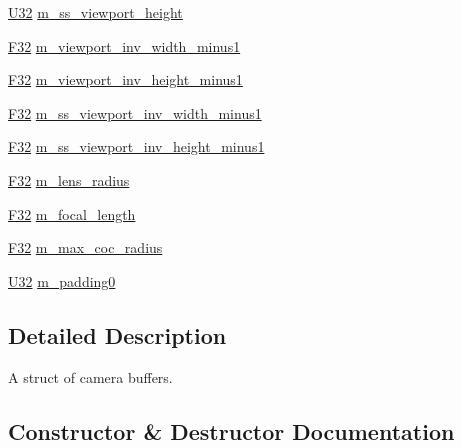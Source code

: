 \begin{DoxyCompactItemize}
\hyperlink{namespacemage_a41c104c036fba3756a74e19f793eeaa1}{U32} \hyperlink{structmage_1_1_camera_buffer_a6bbc5a57e9f456518afacf0a0e5633ed}{m\+\_\+ss\+\_\+viewport\+\_\+height}
\item 
\hyperlink{namespacemage_aa97e833b45f06d60a0a9c4fc22ae02c0}{F32} \hyperlink{structmage_1_1_camera_buffer_a3d56a38eb30fb0f0778d23f61f9988fa}{m\+\_\+viewport\+\_\+inv\+\_\+width\+\_\+minus1}
\item 
\hyperlink{namespacemage_aa97e833b45f06d60a0a9c4fc22ae02c0}{F32} \hyperlink{structmage_1_1_camera_buffer_a05564cd690597c4700ca292c942c0737}{m\+\_\+viewport\+\_\+inv\+\_\+height\+\_\+minus1}
\item 
\hyperlink{namespacemage_aa97e833b45f06d60a0a9c4fc22ae02c0}{F32} \hyperlink{structmage_1_1_camera_buffer_ad881a3acbf1eed761374a50296e35e47}{m\+\_\+ss\+\_\+viewport\+\_\+inv\+\_\+width\+\_\+minus1}
\item 
\hyperlink{namespacemage_aa97e833b45f06d60a0a9c4fc22ae02c0}{F32} \hyperlink{structmage_1_1_camera_buffer_a62f3a9c95c3e3cecfc1744de82ac2ca2}{m\+\_\+ss\+\_\+viewport\+\_\+inv\+\_\+height\+\_\+minus1}
\item 
\hyperlink{namespacemage_aa97e833b45f06d60a0a9c4fc22ae02c0}{F32} \hyperlink{structmage_1_1_camera_buffer_ac3b147c3f8971a8b06bfcb3bd971179c}{m\+\_\+lens\+\_\+radius}
\item 
\hyperlink{namespacemage_aa97e833b45f06d60a0a9c4fc22ae02c0}{F32} \hyperlink{structmage_1_1_camera_buffer_a5ecb7ec90a7bc1900846d53488315d33}{m\+\_\+focal\+\_\+length}
\item 
\hyperlink{namespacemage_aa97e833b45f06d60a0a9c4fc22ae02c0}{F32} \hyperlink{structmage_1_1_camera_buffer_a324324132e7cd8d0d0259a47d0305430}{m\+\_\+max\+\_\+coc\+\_\+radius}
\item 
\hyperlink{namespacemage_a41c104c036fba3756a74e19f793eeaa1}{U32} \hyperlink{structmage_1_1_camera_buffer_a56019b41362cd7ddb5d747ed4705d854}{m\+\_\+padding0}
\end{DoxyCompactItemize}


\subsection{Detailed Description}
A struct of camera buffers. 

\subsection{Constructor \& Destructor Documentation}
\hypertarget{structmage_1_1_camera_buffer_a4f90a7a3c4064fe60f6af1142795afd2}{}\label{structmage_1_1_camera_buffer_a4f90a7a3c4064fe60f6af1142795afd2} 

